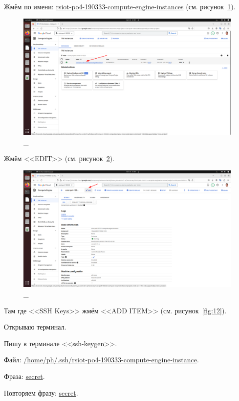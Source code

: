 \documentclass[12pt, a4paper, simple]{eskdtext}
\begin{document}
  Жмём по имени: \underline{rsiot-po4-190333-compute-engine-instances} (см. рисунок~\ref{fig:10}).

  \begin{figure}[!h]
    \centering
    \includegraphics[width=16cm]
    {images/2023-02-25_21-09-26.png}
    \caption{\_}
    \label{fig:10}
  \end{figure}

  Жмём <<EDIT>> (см. рисунок~\ref{fig:11}).

  \begin{figure}[!h]
    \centering
    \includegraphics[width=12cm]
    {images/2023-02-25_21-09-46.png}
    \caption{\_}
    \label{fig:11}
  \end{figure}

  Там где <<SSH Keys>> жмём <<ADD ITEM>> (см. рисунок~\ref{fig:12}).
  
  Открываю терминал.

  Пишу в терминале <<ssh-keygen>>.

  Файл: \underline{/home/ph/.ssh/rsiot-po4-190333-compute-engine-instance}.

  Фраза: \underline{secret}.

  Повторяем фразу: \underline{secret}.
\end{document}
